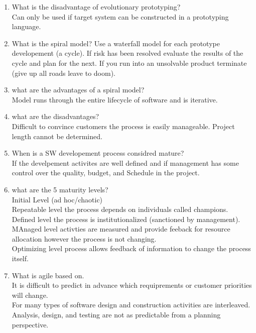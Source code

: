 \documentclass[10pt]{article}
\begin{document}
\begin{enumerate}
      \item What is the disadvantage of evolutionary prototyping?\\
            Can only be used if target system can be constructed in a prototyping language.\\

      \item What is the spiral model?
            Use a waterfall model for each prototype developement (a cycle). If risk has been resolved evaluate the results of the cycle and plan for the next. If you run into an unsolvable
            product terminate (give up all roads leave to doom).\\

      \item what are the advantages of a spiral model?
            \\ Model runs through the entire lifecycle of software and is iterative.\\

      \item what are the disadvantages?\\
            Difficult to convince customers the process is easily manageable. Project length cannot be determined.\\

      \item When is a SW developement process considred mature?\\
            If the develpement activites are well defined and if management has some control over the quality, budget, and Schedule in the project.\\

      \item what are the 5 maturity levels?\\
            Initial Level (ad hoc/chaotic)\\
            Repeatable level the process depends on individuals called champions.\\
            Defined level the process is institutionalized (sanctioned by management).\\
            MAnaged level activties are measured and provide feeback for resource allocation however the process is not changing.\\
            Optimizing level process allows feedback of information to change the process itself.\\

      \item What is agile based on.\\
            It is difficult to predict in advance which requiprements or customer priorities will change.\\
            For many types of software design and construction activities are interleaved.\\
            Analysis, design, and testing are not as predictable from a planning perspective.\\


\end{enumerate}
\end{document}
